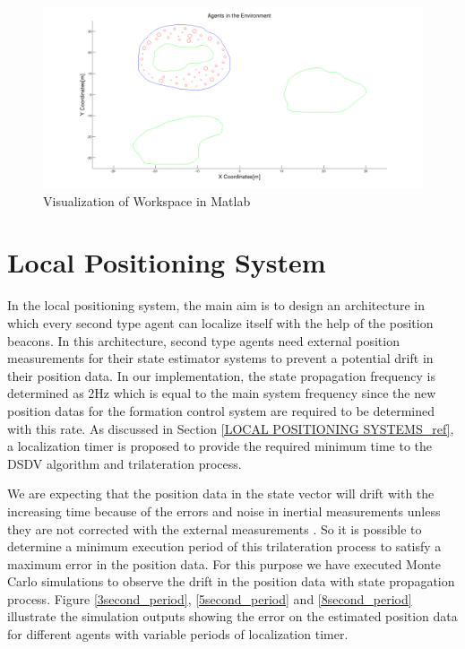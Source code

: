 \begin{figure}[H]
\caption{Visualization of Workspace in Matlab} \label{Matlab_env}
\centerline{\includegraphics[scale = 0.30]{2}}
\end{figure} 
    
\section{Local Positioning System} \label{lps_ref}
In the local positioning system, the main aim is to design an architecture in which every second type agent can localize itself with the help of the position beacons. In this architecture, second type agents need external position measurements for their state estimator systems to prevent a potential drift in their position data. In our implementation, the state propagation frequency is determined as 2Hz which is equal to the main system frequency since the new position datas for the formation control system are required to be determined with this rate. 	As discussed in Section \ref{LOCAL POSITIONING SYSTEMS_ref}, a localization timer is proposed to provide the required minimum time to the DSDV algorithm and trilateration process.

We are expecting that the position data in the state vector will drift with the increasing time because of the errors and noise in inertial measurements unless they are not corrected with the external measurements \cite{91}. So it is possible to determine a minimum execution period of this trilateration process to satisfy a maximum error in the position data. For this purpose we have executed Monte Carlo simulations to observe the drift in the position data with state propagation process. Figure \ref{3second_period}, \ref{5second_period} and \ref{8second_period} illustrate the simulation outputs showing the error on the estimated position data for different agents with variable periods of localization timer.
		
